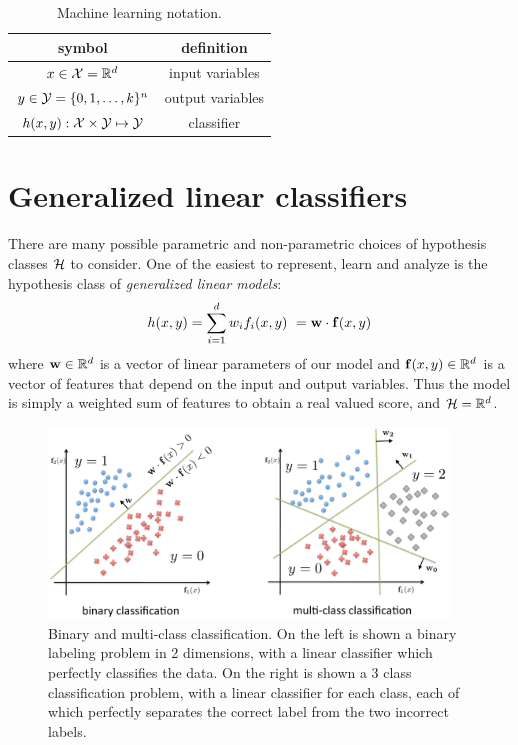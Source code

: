 \begin{table}[tb!]
\centering
\begin{tabular}{| c | c | }
\hline
symbol & definition \\
\hline
\hline
$x \in \mathcal{X} = \mathbb{R}^d$ & input variables\\
$y \in \mathcal{Y} =\{0,1,\ldots,k\}^n$ & output variables \\
$h(x,y): \mathcal{X} \times \mathcal{Y} \mapsto \mathcal{Y}$ & classifier \\
\hline
\end{tabular}
\caption[Machine learning notation]{Machine learning notation.}
\label{tab:notation}
\end{table}



\section{Generalized linear classifiers}\label{sec:glms}
There are many possible parametric and non-parametric choices of hypothesis 
classes $\mathcal{H}$ to consider.  One of the easiest to represent, learn and analyze 
is the hypothesis class of {\em generalized linear models}:
\begin{equation}
h(x,y) = \sum_{i=1}^d w_i f_i(x,y)\ = \mathbf{w} \cdot \mathbf{f}(x,y) \end{equation}
where $\mathbf{w} \in \mathbb{R}^d$ is a vector of linear parameters of our model and 
$\mathbf{f}(x,y) \in \mathbb{R}^d$ is a vector of features that depend on the input and 
output variables.  Thus the model is simply a weighted sum of features to 
obtain a real valued score, and $\mathcal{H} = \mathbb{R}^d$.


\begin{figure}[tb]
\begin{center}
\includegraphics[width=0.95\textwidth]{figs/binary-multiclass-ml.pdf}
\caption[Binary and multi-class linear classification.]{Binary and multi-class classification.  On the left is shown a binary labeling problem in 2 dimensions, with a linear classifier which perfectly classifies the data.  On the right is shown a 3 class classification problem, with a linear classifier for each class, each of which perfectly separates the correct label from the two incorrect labels.}
\label{fig:binary-multiclass-ml}
\end{center}
\end{figure}


